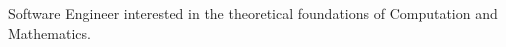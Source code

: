 
    \begin{cvparagraph}
        Software Engineer interested in the theoretical foundations of Computation and Mathematics.
    \end{cvparagraph}
